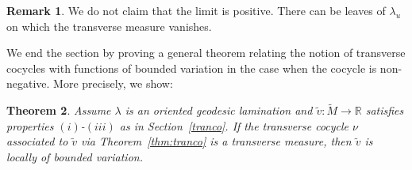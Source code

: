\documentclass{ip-journal}
\newtheorem{theorem}{Theorem}[section]
\theoremstyle{definition}
\newtheorem{remark}[theorem]{Remark}
\numberwithin{equation}{section}
\newcommand{\R}{\mathbb R}
\begin{document}
  
  \begin{remark}We do not claim that the limit is positive. There can be leaves of $ \lambda_u$ on which the transverse measure vanishes.
\end{remark}
  
  We end the section by proving a general theorem relating the notion of transverse cocycles with functions of bounded variation in the case when the cocycle is non-negative. More precisely, we show:
  
  
  \begin{theorem}\label{transcoismeasthm} Assume $\lambda$ is an oriented geodesic lamination and $\tilde v: \tilde M \rightarrow \R$ satisfies properties $(i)$-$(iii)$ as in Section~\ref{tranco}. If the transverse cocycle $\nu$ associated to $\tilde v$ via Theorem~\ref{thm:tranco} is a transverse measure, then $\tilde v$ is locally of bounded variation.
  \end{theorem}
  
\end{document}
